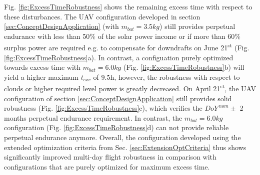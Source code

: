 Fig. \ref{fig:ExcessTimeRobustness} shows the remaining excess time with respect to these disturbances. The UAV configuration developed in section \ref{sec:ConceptDesignApplication} (with $m_{bat}=3.5kg$) still provides perpetual endurance with less than 50\% of the solar power income or if more than 60\% surplus power are required e.g. to compensate for downdrafts on June 21\textsuperscript{st} (Fig. \ref{fig:ExcessTimeRobustness}a). In contrast, a configuation purely optimized towards excess time with $m_{bat}=6.0kg$ (Fig. \ref{fig:ExcessTimeRobustness}b) will yield a higher maximum $t_{exc}$ of 9.5h, however, the robustness with respect to clouds or higher required level power is greatly decreased. On April  21\textsuperscript{st}, the UAV configuration of section \ref{sec:ConceptDesignApplication} still provides solid robustness (Fig. \ref{fig:ExcessTimeRobustness}c), which verifies the $DoY^{\,nom}\pm$ 2 months perpetual endurance requirement. In contrast, the $m_{bat}=6.0kg$ configuration (Fig. \ref{fig:ExcessTimeRobustness}d) can not provide reliable perpetual endurance anymore. Overall, the configuration developed using the extended optimization criteria from Sec. \ref{sec:ExtensionOptCriteria} thus shows significantly improved multi-day flight robustness in comparison with configurations that are purely optimized for maximum excess time.